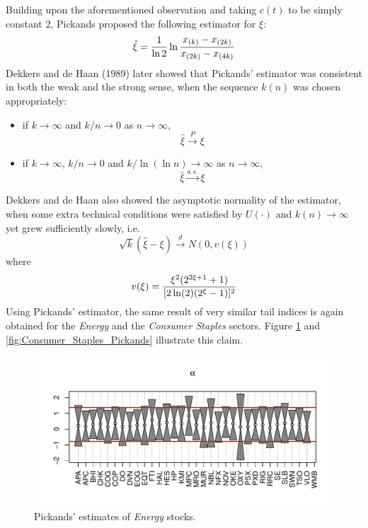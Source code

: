 \documentclass{article}
\newcommand{\1}[1]{
  \mathbf{1}_{\{#1\}}
}
\begin{document}
Building upon the aforementioned observation and taking $c(t)$ to
be simply constant 2, Pickands proposed the following estimator for
$\xi$:
\[
\hat \xi = {1 \over \ln 2} \ln {
  x_{(k)} - x_{(2k)}
  \over
  x_{(2k)} - x_{(4k)}
}
\]
Dekkers and de Haan (1989) later showed \cite{dekkers1989estimation}
that Pickands' estimator was consistent in both the weak and the strong
sense, when the sequence $k(n)$ was chosen appropriately:
\begin{itemize}
\item if $k \to \infty$ and $k/n \to 0$ as $n \to \infty$,
  \[
  \hat \xi \overset{P}{\to} \xi
  \]
\item if $k \to \infty$, $k/n \to 0$ and $k / \ln(\ln n) \to \infty$
  as $n \to \infty$,
  \[
  \hat \xi \overset{a.s.}{\to} \xi
  \]
\end{itemize}
Dekkers and de Haan \cite{dekkers1989estimation} also showed the
asymptotic normality of the estimator, when some
extra technical conditions were satisfied by
$U(\cdot)$ and $k(n) \to \infty$ yet grew sufficiently slowly, i.e.
\[
\sqrt k (\hat \xi - \xi) \overset{d}{\to} N(0, v(\xi))
\]
where
\[
v(\xi) = {
  \xi^2 (2^{2 \xi + 1} + 1)
  \over
  [2 \ln(2) (2^\xi - 1)]^2
}
\]
Using Pickands' estimator, the same result of very similar tail indices
is again obtained for the {\it Energy} and the {\it Consumer Staples}
sectors. Figure \ref{fig:Energy_Pickands} and
\ref{fig:Consumer_Staples_Pickands} illustrate this claim.
\begin{figure}[htb!]
  \includegraphics[width=\textwidth]{Energy_Pickands.pdf}
  \caption{Pickands' estimates of {\it Energy} stocks.}
  \label{fig:Energy_Pickands}
\end{figure}
\end{document}
